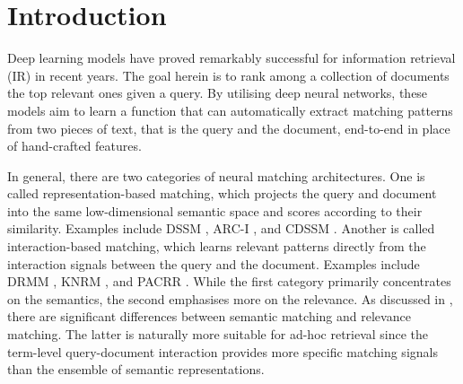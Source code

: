 \section{Introduction}
Deep learning models have proved remarkably successful for information retrieval (IR) in recent years. The goal herein is to 
rank among a collection of documents the top relevant ones given a query. By utilising deep neural networks, these models aim to learn a function that can automatically extract matching patterns from two pieces of text, that is the query and the document, end-to-end in place of hand-crafted features. 

In general, there are two categories of neural matching architectures. One is called representation-based matching, which projects the query and document into the same low-dimensional semantic space and scores according to their similarity. Examples include DSSM \cite{huang2013learning}, ARC-I \cite{hu2014convolutional}, and CDSSM \cite{shen2014latent}. Another is called interaction-based matching, which learns relevant patterns directly from the interaction signals between the query and the document. Examples include DRMM \cite{guo2016deep}, KNRM \cite{xiong2017end}, 
and PACRR \cite{hui2017pacrr,hui2018co}. While the first category primarily concentrates on the semantics, the second emphasises more on the relevance. As discussed in \cite{guo2016deep}, there are significant differences between semantic matching and relevance matching. The latter is naturally more suitable for ad-hoc retrieval since the term-level query-document interaction provides more specific matching signals than the ensemble of semantic representations. 

